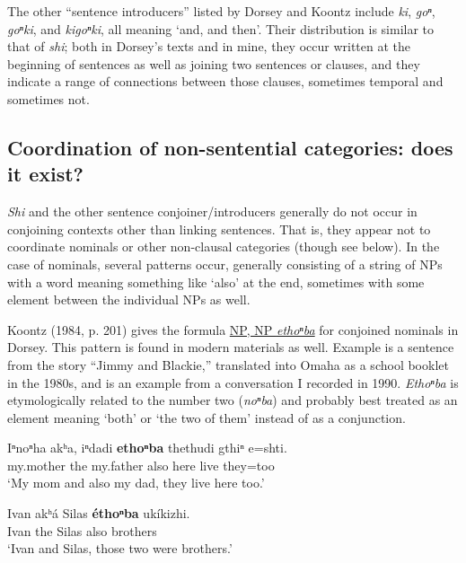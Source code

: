 \documentclass[output=paper]{LSP/langsci}
\begin{document}
The other ``sentence introducers'' listed by Dorsey and Koontz include \textit{ki}, \textit{goⁿ}, \textit{goⁿki}, and \textit{kigoⁿki}, all meaning `and, and then'. Their distribution is similar to that of \textit{shi}; both in Dorsey's texts and in mine, they occur written at the beginning of sentences as well as joining two sentences or clauses, and they indicate a range of connections between those clauses, sometimes temporal and sometimes not. 

\subsection{Coordination of non-sentential categories: does it exist?}

\textit{Shi} and the other sentence conjoiner/introducers generally do not occur in conjoining contexts other than linking sentences. That is, they appear not to coordinate nominals or other non-clausal categories (though see  below).  In the case of nominals, several patterns occur, generally consisting of a string of NPs with a word meaning something like `also' at the end, sometimes with some element between the individual NPs as well.  

Koontz (1984, p. 201) gives the formula \underline{NP, NP \textit{ethoⁿba}} for conjoined nominals in Dorsey.  This pattern is found in modern materials as well.  Example  is a sentence from the story ``Jimmy and Blackie,'' translated into Omaha as a school booklet in the 1980s, and  is an example from a conversation I recorded in 1990. \textit{Ethoⁿba} is etymologically related to the number two (\textit{noⁿba}) and probably best treated as an element meaning `both' or `the two of them' instead of as a conjunction.

\begin{exe}
\ex\label{ex:rudin:12} 
\gll  Iⁿnoⁿha  	akʰa, iⁿdadi    \textbf{ethoⁿba} 	thethudi 	gthiⁿ 	e=shti.  \\
	my.mother 	the  	my.father 	also        	here       	live   	they=too\\
\trans `My mom and also my dad, they live here too.'

\ex\label{ex:rudin:13} 
\gll  Ivan 	akʰá Silas 	\textbf{éthoⁿba} ukíkizhi. \\         
Ivan the   Silas	 also       	brothers\\
\trans`Ivan and Silas, those two were brothers.'
\end{exe}
\end{document}
